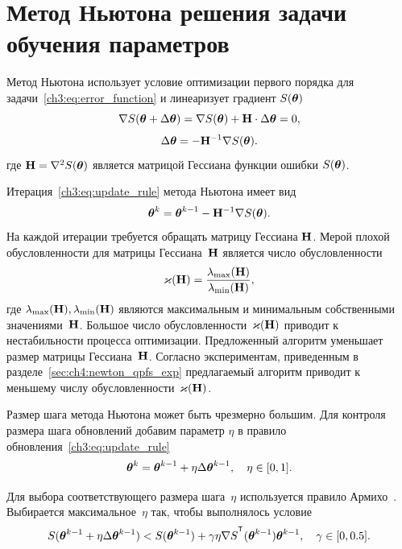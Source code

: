 \section{Метод Ньютона решения задачи обучения параметров}
\label{sec:ch4:newton_algorithm}

Метод Ньютона использует условие оптимизации первого порядка для задачи~\eqref{ch3:eq:error_function} и линеаризует градиент $S (\boldsymbol{\theta})$
\[
\nabla S (\boldsymbol{\theta} + \Delta \boldsymbol{\theta}) = \nabla S(\boldsymbol{\theta}) + \mathbf{H} \cdot \Delta \boldsymbol{\theta} = 0,
\]
\[
\Delta \boldsymbol{\theta} = - \mathbf{H}^{-1} \nabla S(\boldsymbol{\theta}).
\]
где $\mathbf{H} = \nabla^2 S(\boldsymbol{\theta})$ является матрицой Гессиана функции ошибки $S(\boldsymbol{\theta})$.

Итерация~\eqref{ch3:eq:update_rule} метода Ньютона имеет вид
\[
\boldsymbol{\theta}^k = \boldsymbol{\theta}^{k-1} - \mathbf{H}^{-1} \nabla S(\boldsymbol{\theta}).
\]
На каждой итерации требуется обращать матрицу Гессиана $\mathbf{H}$.
Мерой плохой обусловленности для матрицы Гессиана~$\mathbf{H}$ является число обусловленности
\[
\varkappa(\mathbf{H}) = \frac{\lambda_{\text{max}}(\mathbf{H})}{\lambda_{\text{min}}(\mathbf{H})},
\]
где $\lambda_{\text{max}}(\mathbf{H}), \lambda_{\text{min}}(\mathbf{H})$ являются максимальным и минимальным собственными значениями~$\mathbf{H}$. Большое число обусловленности~$\varkappa (\mathbf{H})$ приводит к нестабильности процесса оптимизации.
Предложенный алгоритм уменьшает размер матрицы Гессиана~$\mathbf{H}$. Согласно экспериментам, приведенным в разделе~\ref{sec:ch4:newton_qpfs_exp} предлагаемый алгоритм приводит к меньшему числу обусловленности~$\varkappa (\mathbf{H})$.

Размер шага метода Ньютона может быть чрезмерно большим. Для контроля размера шага обновлений добавим параметр $\eta$ в правило обновления~\eqref{ch3:eq:update_rule}
\[
\boldsymbol{\theta}^k = \boldsymbol{\theta}^{k - 1} + \eta \Delta \boldsymbol{\theta}^{k - 1}, \quad \eta \in [0, 1].
\]

Для выбора соответствующего размера шага~$\eta$ используется правило Армихо~\cite{armijo1966minimization}. Выбирается максимальное~$\eta$ так, чтобы выполнялось условие
\[
S(\btheta^{k - 1} + \eta \Delta \btheta^{k - 1}) < S(\btheta^{k - 1}) + \gamma \eta \nabla S^{\T}(\btheta^{k-1})\btheta^{k - 1}, \quad \gamma \in [0, 0.5].
\]

